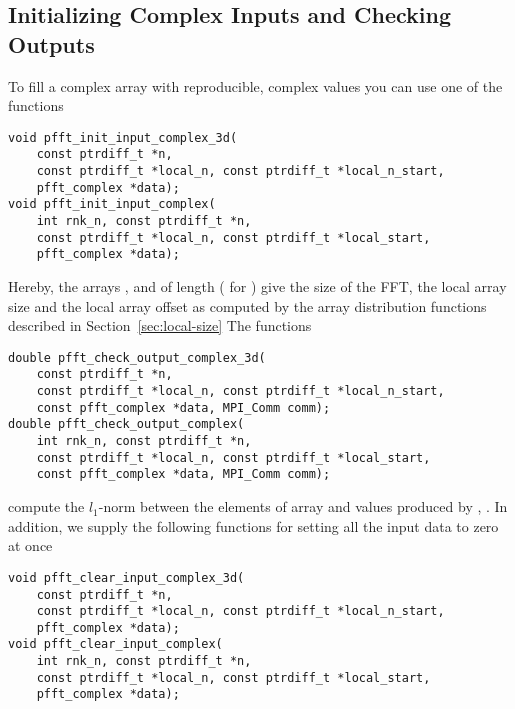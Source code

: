 \subsection{Initializing Complex Inputs and Checking Outputs}\label{sec:init-data-3d-c2c}
To fill a complex array  with reproducible, complex values you can use one of the functions
\begin{lstlisting}
void pfft_init_input_complex_3d(
    const ptrdiff_t *n,
    const ptrdiff_t *local_n, const ptrdiff_t *local_n_start,
    pfft_complex *data);
void pfft_init_input_complex(
    int rnk_n, const ptrdiff_t *n,
    const ptrdiff_t *local_n, const ptrdiff_t *local_start,
    pfft_complex *data);
\end{lstlisting}
Hereby, the arrays ,  and  of length  ( for )
give the size of the FFT, the local array size and the local array offset
as computed by the array distribution functions described in Section~\ref{sec:local-size}
The functions
\begin{lstlisting}
double pfft_check_output_complex_3d(
    const ptrdiff_t *n, 
    const ptrdiff_t *local_n, const ptrdiff_t *local_n_start,
    const pfft_complex *data, MPI_Comm comm);
double pfft_check_output_complex(
    int rnk_n, const ptrdiff_t *n,
    const ptrdiff_t *local_n, const ptrdiff_t *local_start,
    const pfft_complex *data, MPI_Comm comm);
\end{lstlisting}
compute the $l_1$-norm between the elements of array  and values produced by , .
In addition, we supply the following functions for setting all the input data to zero at once
\begin{lstlisting}
void pfft_clear_input_complex_3d(
    const ptrdiff_t *n,
    const ptrdiff_t *local_n, const ptrdiff_t *local_n_start,
    pfft_complex *data);
void pfft_clear_input_complex(
    int rnk_n, const ptrdiff_t *n,
    const ptrdiff_t *local_n, const ptrdiff_t *local_start,
    pfft_complex *data);
\end{lstlisting}

